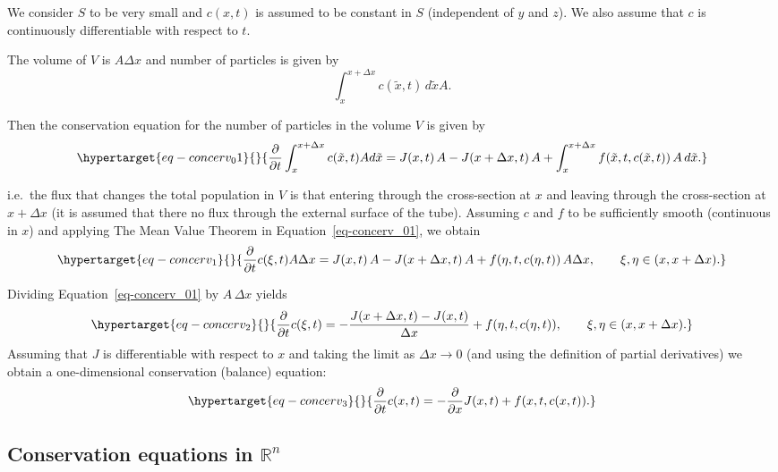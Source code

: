 \documentclass[
  letterpaper,
  DIV=11,
  numbers=noendperiod]{scrreprt}
\theoremstyle{plain}
\theoremstyle{definition}
\theoremstyle{plain}
\theoremstyle{remark}
\begin{document}
We consider \(S\) to be very small and \(c(x,t)\) is assumed to be
constant in \(S\) (independent of \(y\) and \(z\)). We also assume that
\(c\) is continuously differentiable with respect to \(t\).

The volume of \(V\) is \(A \Delta x\) and number of particles is given
by \[
\int_x^{x+\Delta x} c(\tilde x, t) \,  d \tilde x A.
\]

Then the conservation equation for the number of particles in the volume
\(V\) is given by \begin{equation}\protect\hypertarget{eq-concerv_01}{}{
\frac{\partial}{\partial t} \int_x^{x+\Delta x} c(\tilde x, t) A d\tilde x = J(x,t) \, A  - J(x+\Delta x,t) \, A +\int_x^{x + \Delta x}  f(\tilde x, t, c(\tilde x, t))\,  A \, d \tilde x.
}\label{eq-concerv_01}\end{equation}

i.e.~the flux that changes the total population in \(V\) is that
entering through the cross-section at \(x\) and leaving through the
cross-section at \(x+\Delta x\) (it is assumed that there no flux
through the external surface of the tube). Assuming \(c\) and \(f\) to
be sufficiently smooth (continuous in \(x\)) and applying The Mean Value
Theorem in Equation~\ref{eq-concerv_01}, we obtain
\begin{equation}\protect\hypertarget{eq-concerv_1}{}{
\frac{\partial}{\partial t} c(\xi, t) A \Delta x = J(x,t) \, A  - J(x+\Delta x,t) \, A +  f(\eta,t,c(\eta, t))\,  A \Delta x, \qquad \xi, \eta \in (x, x+ \Delta x).
}\label{eq-concerv_1}\end{equation}

Dividing Equation~\ref{eq-concerv_01} by \(A \, \Delta x\) yields
\begin{equation}\protect\hypertarget{eq-concerv_2}{}{
\frac{\partial}{\partial t} c(\xi, t)  = - \frac  {J(x+\Delta x,t ) - J(x,t)} { \Delta x} + f(\eta,t,c(\eta, t)), \qquad \xi, \eta \in (x, x+ \Delta x).
}\label{eq-concerv_2}\end{equation} Assuming that \(J\) is
differentiable with respect to \(x\) and taking the limit as
\(\Delta x \to 0\) (and using the definition of partial derivatives) we
obtain a one-dimensional conservation (balance) equation:
\begin{equation}\protect\hypertarget{eq-concerv_3}{}{
\frac{\partial}{\partial t} c(x,t)  = - \frac  {\partial} { \partial x} J(x,t) + f(x,t ,c(x,t)).
}\label{eq-concerv_3}\end{equation}

\hypertarget{conservation-equations-in-mathbb-rn}{%
\subsection{\texorpdfstring{Conservation equations in
\(\mathbb R^n\)}{Conservation equations in \textbackslash mathbb R\^{}n}}\label{conservation-equations-in-mathbb-rn}}
\end{document}
